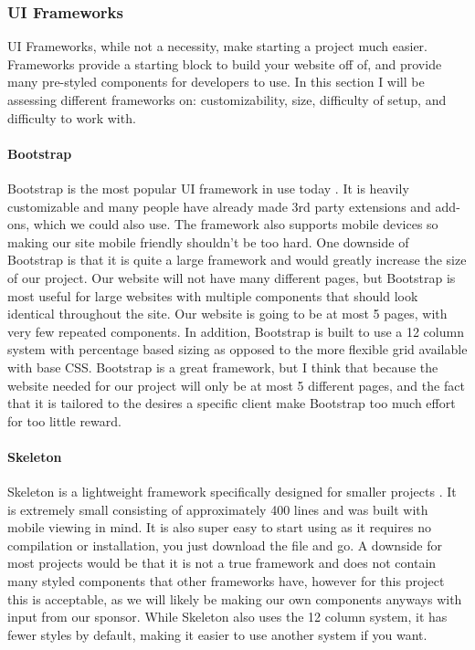 \documentclass[onecolumn, draftclsnofoot,10pt, compsoc]{IEEEtran}
\begin{document}
        \subsubsection{UI Frameworks}
            UI Frameworks, while not a necessity, make starting a project much easier. Frameworks provide a starting block to build your website off of, and provide many pre-styled components for developers to use. In this section I will be assessing different frameworks on: customizability, size, difficulty of setup, and difficulty to work with.
            \paragraph{Bootstrap}
            Bootstrap is the most popular UI framework in use today \cite{IEEEhowto:Bootstrap}. It is heavily customizable and many people have already made 3rd party extensions and add-ons, which we could also use. The framework also supports mobile devices so making our site mobile friendly shouldn't be too hard. One downside of Bootstrap is that it is quite a large framework and would greatly increase the size of our project. Our website will not have many different pages, but Bootstrap is most useful for large websites with multiple components that should look identical throughout the site. Our website is going to be at most 5 pages, with very few repeated components. In addition, Bootstrap is built to use a 12 column system with percentage based sizing as opposed to the more flexible grid available with base CSS. Bootstrap is a great framework, but I think that because the website needed for our project will only be at most 5 different pages, and the fact that it is tailored to the desires a specific client make Bootstrap too much effort for too little reward.
            \paragraph{Skeleton}
            Skeleton is a lightweight framework specifically designed for smaller projects \cite{IEEEhowto:Skeleton}. It is extremely small consisting of approximately 400 lines and was built with mobile viewing in mind. It is also super easy to start using as it requires no compilation or installation, you just download the file and go. A downside for most projects would be that it is not a true framework and does not contain many styled components that other frameworks have, however for this project this is acceptable, as we will likely be making our own components anyways with input from our sponsor. While Skeleton also uses the 12 column system, it has fewer styles by default, making it easier to use another system if you want.
\end{document}
